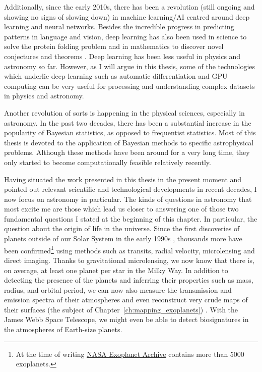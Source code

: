 \documentclass[12pt,dvipsnames]{report}
\begin{document}
Additionally, since the early 2010s, there has been a revolution (still ongoing and 
showing no signs of slowing down) in machine learning/AI centred around 
deep learning and neural networks.
Besides the incredible progress in predicting patterns in language
and vision, deep learning has also been used in science to solve
the protein folding problem \citep{2021Natur.596..583J} and in mathematics 
to discover novel conjectures and theorems
\citep{2021Natur.600...70D}. Deep learning has been less useful in physics and
astronomy so far. However, as I will argue in this thesis, some of the technologies
which underlie deep learning such as automatic differentiation and GPU
computing can be very useful for processing and understanding complex datasets in physics 
and astronomy.

Another revolution of sorts is happening in the physical sciences, especially in astronomy.
In the past two decades, there has been a substantial increase in the popularity of Bayesian
statistics, as opposed to frequentist statistics. 
Most of this thesis is devoted to the application of Bayesian methods to specific 
astrophysical problems.
Although these methods have been around for a very long time, they only started to become 
computationally feasible relatively recently.


Having situated the work presented in this thesis in the present moment and pointed
out relevant scientific and technological developments in recent decades, I now focus on astronomy 
in particular. The kinds of questions in astronomy that
most excite me are those which lead us closer to answering one of those two
fundamental questions I stated at the beginning of this chapter. In particular,
the question about the origin of life in the universe. Since the first discoveries of 
planets outside of our Solar System in the early 1990s
\citep{1992Natur.355..145W,1995Natur.378..355M}, thousands more have been
confirmed\footnote{At the time of writing 
    \href{https://exoplanetarchive.ipac.caltech.edu/}{NASA Exoplanet Archive}
    contains more than 5000 exoplanets.} using methods such as transits, radial
velocity, microlensing and direct imaging. Thanks to gravitational microlensing,
we now know \citep{2012Natur.481..167C} that there is, on average, at least one planet per
star in the Milky Way. In addition to detecting the presence of the planets and
inferring their properties such as mass, radius, and orbital period, 
we can now also measure the transmission and emission spectra of their atmospheres
and even reconstruct very crude maps of their surfaces (the subject of
    Chapter~\ref{ch:mapping_exoplanets})
\citep{2007Natur.447..183K,2012ApJ...747L..20M}. With the James Webb Space
Telescope, we might even be able to detect biosignatures in the atmospheres of
Earth-size planets.
\end{document}
